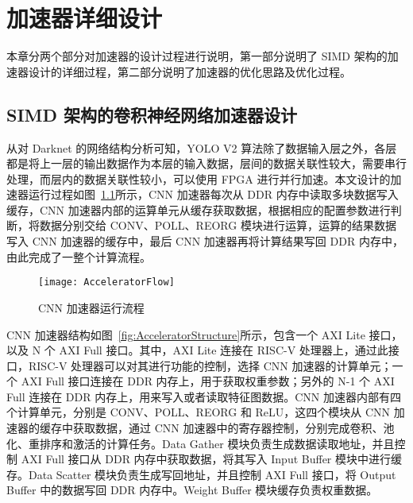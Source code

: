 \chapter{加速器详细设计}\label{chap:accelerator}

本章分两个部分对加速器的设计过程进行说明，第一部分说明了 SIMD 架构的加速器设计的详细过程，第二部分说明了加速器的优化思路及优化过程。

\section{SIMD 架构的卷积神经网络加速器设计}


从对 Darknet 的网络结构分析可知，YOLO V2 算法除了数据输入层之外，各层都是将上一层的输出数据作为本层的输入数据，层间的数据关联性较大，需要串行处理，而层内的数据关联性较小，可以使用 FPGA 进行并行加速。本文设计的加速器运行过程如图~\ref{fig:AcceleratorFlow}所示，CNN 加速器每次从 DDR 内存中读取多块数据写入缓存，CNN 加速器内部的运算单元从缓存获取数据，根据相应的配置参数进行判断，将数据分别交给 CONV、POLL、REORG 模块进行运算，运算的结果数据写入 CNN 加速器的缓存中，最后 CNN 加速器再将计算结果写回 DDR 内存中，由此完成了一整个计算流程。

\begin{figure}[!htbp]
    \centering
    \texttt{[image: AcceleratorFlow]}
    \caption{CNN 加速器运行流程}
    \label{fig:AcceleratorFlow}
\end{figure}


CNN 加速器结构如图~\ref{fig:AcceleratorStructure}所示，包含一个 AXI Lite 接口，以及 N 个 AXI Full 接口。其中，AXI Lite 连接在 RISC-V 处理器上，通过此接口，RISC-V 处理器可以对其进行功能的控制，选择 CNN 加速器的计算单元；一个 AXI Full 接口连接在 DDR 内存上，用于获取权重参数；另外的 N-1 个 AXI Full 连接在 DDR 内存上，用来写入或者读取特征图数据。CNN 加速器内部有四个计算单元，分别是 CONV、POLL、REORG 和 ReLU，这四个模块从 CNN 加速器的缓存中获取数据，通过 CNN 加速器中的寄存器控制，分别完成卷积、池化、重排序和激活的计算任务。Data Gather 模块负责生成数据读取地址，并且控制 AXI Full 接口从 DDR 内存中获取数据，将其写入 Input Buffer 模块中进行缓存。Data Scatter 模块负责生成写回地址，并且控制 AXI Full 接口，将 Output Buffer 中的数据写回 DDR 内存中。Weight Buffer 模块缓存负责权重数据。

